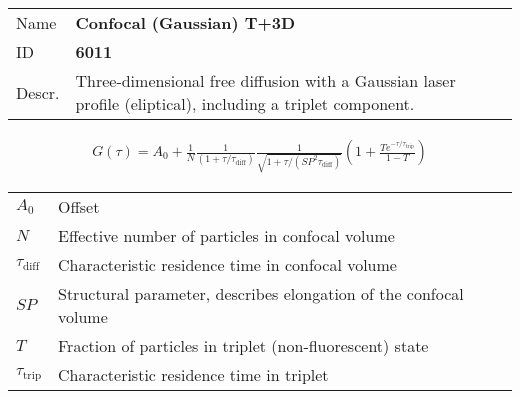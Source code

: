 \noindent \begin{tabular}{lp{}}
Name & \textbf{Confocal (Gaussian) T+3D} \\ 
ID & \textbf{6011} \\ 
Descr. &  Three-dimensional free diffusion with a Gaussian laser profile (eliptical), including a triplet component\cite{Widengren1994, Widengren1995, Haupts1998}. \\ 
\end{tabular}
\begin{align}
G(\tau) = A_0 + \frac{1}{N} \frac{1}{(1+\tau/\tau_\mathrm{diff})} \frac{1}{\sqrt{1+\tau/(\mathit{SP}^2 \tau_\mathrm{diff})}} \left(1 + \frac{T e^{-\tau/\tau_\mathrm{trip}}}{1-T}  \right)
\end{align} 
\begin{center}
\begin{tabular}{ll}
$A_0$ & Offset \\ 
$N$ & Effective number of particles in confocal volume \\ 
$\tau_\mathrm{diff}$ &  Characteristic residence time in confocal volume \\ 
$\mathit{SP}$ & Structural parameter, describes elongation of the confocal volume \\
$T$ &  Fraction of particles in triplet (non-fluorescent) state\\ 
$\tau_\mathrm{trip}$ &  Characteristic residence time in triplet \\
\end{tabular}
\end{center}
\vspace{2em}



